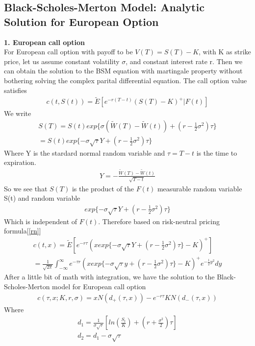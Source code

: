 \documentclass[a4paper]{article}
\begin{document}
\subsection{Black-Scholes-Merton Model: Analytic Solution for European Option}
{\bf1. European call option}\\
For European call option with payoff to be $V(T) = S(T) - K$, with K as strike price, let us assume constant volatility $\sigma$, and constant interest rate r. 
Then we can obtain the solution to the BSM equation with martingale property without bothering solving the complex parital
differential equation. The call option value satisfies
\begin{align*}
	c(t, S(t)) = \tilde E[e^{-r(T-t)}(S(T)-K)^+|F(t)]
\end{align*}
We write
\begin{align*}
	S(T) = S(t) exp\{\sigma(\tilde W(T) -\tilde W(t)) + (r - \frac{1}{2} \sigma^2) \tau\} \\
	     = S(t) exp\{-\sigma \sqrt{\tau} Y + (r - \frac{1}{2}\sigma^2)\tau\}
\end{align*}
Where Y is the stardard normal random variable and $\tau = T - t$ is the time to expiration. 
\begin{align*}
        Y = -\frac{\tilde W(T) - \tilde W(t)}{\sqrt{T - t}}
\end{align*}
So we see that $S(T)$ is the product of the $F(t)$ measurable random variable S(t) and random variable
\begin{align*}
        exp\{-\sigma \sqrt{\tau} Y +(r - \frac{1}{2} \sigma^2) \tau \}
\end{align*}
Which is independent of $F(t)$.
Therefore based on risk-neutral pricing formula[\ref{rn}]
\begin{align*}
        c(t,x) = \tilde E[e^{-r\tau}(x exp\{ -\sigma \sqrt{\tau} Y + (r - \frac{1}{2} \sigma^2)\tau\} -K)^+]\\
        = \frac{1}{\sqrt{2\pi}} \int_{-\infty}^{\infty} e^{-\tau r}(x exp\{-\sigma \sqrt{\tau} y
        +(r -\frac{1}{2}\sigma^2)\tau \} -K)^+ e^{-\frac{1}{2}y^2} dy
\end{align*}
After a little bit of math with integration, we have the solution to the Black-Scholes-Merton model for European call option
\begin{align*}
	c(\tau,x; K,r,\sigma) = xN(d_{+}(\tau,x)) - e^{-r\tau}KN(d_{-}(\tau,x))
\end{align*}
Where
\begin{align*}
	d_1 = \frac{1}{\sigma \sqrt{\tau}}[ln(\frac{S_t}{K}) + (r+ \frac{\sigma^2}{2})\tau] \\
	d_2 = d_1 - \sigma \sqrt{\tau}
\end{align*}
\end{document}
